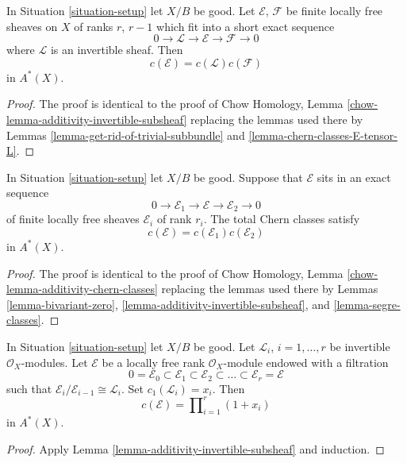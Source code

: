 \begin{lemma}
\label{lemma-additivity-invertible-subsheaf}
In Situation \ref{situation-setup} let $X/B$ be good.
Let $\mathcal{E}$, $\mathcal{F}$ be finite locally free sheaves
on $X$ of ranks $r$, $r - 1$ which fit into a short
exact sequence
$$
0 \to \mathcal{L} \to \mathcal{E} \to \mathcal{F} \to 0
$$
where $\mathcal{L}$ is an invertible sheaf.
Then
$$
c(\mathcal{E}) = c(\mathcal{L}) c(\mathcal{F})
$$
in $A^*(X)$.
\end{lemma}

\begin{proof}
The proof is identical to the proof of
Chow Homology, Lemma \ref{chow-lemma-additivity-invertible-subsheaf}
replacing the lemmas used there by
Lemmas
\ref{lemma-get-rid-of-trivial-subbundle} and
\ref{lemma-chern-classes-E-tensor-L}.
\end{proof}

\begin{lemma}
\label{lemma-additivity-chern-classes}
In Situation \ref{situation-setup} let $X/B$ be good.
Suppose that $\mathcal{E}$ sits in an exact sequence
$$
0
\to
\mathcal{E}_1
\to
\mathcal{E}
\to
\mathcal{E}_2
\to
0
$$
of finite locally free sheaves $\mathcal{E}_i$ of rank $r_i$.
The total Chern classes satisfy
$$
c(\mathcal{E}) = c(\mathcal{E}_1) c(\mathcal{E}_2)
$$
in $A^*(X)$.
\end{lemma}

\begin{proof}
The proof is identical to the proof of
Chow Homology, Lemma \ref{chow-lemma-additivity-chern-classes}
replacing the lemmas used there by
Lemmas \ref{lemma-bivariant-zero},
\ref{lemma-additivity-invertible-subsheaf}, and
\ref{lemma-segre-classes}.
\end{proof}

\begin{lemma}
\label{lemma-chern-filter-by-linebundles}
In Situation \ref{situation-setup} let $X/B$ be good.
Let ${\mathcal L}_i$, $i = 1, \ldots, r$ be invertible
$\mathcal{O}_X$-modules.
Let $\mathcal{E}$ be a locally free rank
$\mathcal{O}_X$-module endowed with a filtration
$$
0 = \mathcal{E}_0 \subset \mathcal{E}_1 \subset \mathcal{E}_2
\subset \ldots \subset \mathcal{E}_r = \mathcal{E}
$$
such that $\mathcal{E}_i/\mathcal{E}_{i - 1} \cong \mathcal{L}_i$.
Set $c_1({\mathcal L}_i) = x_i$. Then
$$
c(\mathcal{E})
=
\prod\nolimits_{i = 1}^r (1 + x_i)
$$
in $A^*(X)$.
\end{lemma}

\begin{proof}
Apply Lemma \ref{lemma-additivity-invertible-subsheaf} and induction.
\end{proof}



















